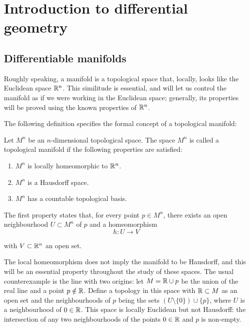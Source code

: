 \chapter{Introduction to differential geometry}

\section{Differentiable manifolds}

Roughly speaking, a manifold is a topological space that, locally, looks like the Euclidean space $\mathbb{R}^n$. This similitude is essential, and will let us control the manifold as if we were working in the Euclidean space; generally, its properties will be proved using the known properties of $\mathbb{R}^n$.

The following definition specifies the formal concept of a topological manifold:

\begin{definition}
    Let $M^n$ be an $n$-dimensional topological space. The space $M^n$ is called a topological manifold if the following properties are satisfied:
    \begin{enumerate}
        \item $M^n$ is locally homeomorphic to $\mathbb{R}^n$. \label{def:manifold:homeo}
        \item $M^n$ is a Hausdorff space. \label{def:manifold:haussdorf}
        \item $M^n$ has a countable topological basis. \label{def:manifold:basis}
    \end{enumerate}
\end{definition}

The first property states that, for every point $p \in M^n$, there exists an open neighbourhood $U \subset M^n$ of $p$ and a homeomorphism
\[
    h \colon U \to V
\]

with $V \subset \mathbb{R}^n$ an open set.

The local homeomorphism does not imply the manifold to be Hausdorff, and this will be an essential property throughout the study of these spaces. The usual counterexample is the line with two origins: let $M = \mathbb{R} \cup p$ be the union of the real line and a point $p \notin \mathbb{R}$. Define a topology in this space with $\mathbb{R} \subset M$ as an open set and the neighbourhoods of $p$ being the sets $(U \setminus \{0\}) \cup \{p\}$, where $U$ is a neighbourhood of $0 \in \mathbb{R}$. This space is locally Euclidean but not Hausdorff: the intersection of any two neighbourhoods of the points $0 \in \mathbb{R}$ and $p$ is non-empty.

